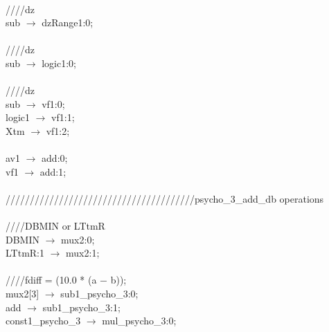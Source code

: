{   \\
   \hspace*{2em}////dz \\
   \hspace*{2em}sub $\rightarrow$ dzRange1:0; \\
   \\
   \hspace*{2em}////dz \\
   \hspace*{2em}sub $\rightarrow$ logic1:0; \\
   \\
   \hspace*{2em}////dz \\
   \hspace*{2em}sub $\rightarrow$ vf1:0; \\
   \hspace*{2em}logic1 $\rightarrow$ vf1:1; \\
   \hspace*{2em}Xtm $\rightarrow$ vf1:2; \\
   \\
   \hspace*{2em}av1 $\rightarrow$ add:0; \\
   \hspace*{2em}vf1 $\rightarrow$ add:1; \\
   \\
   \hspace*{2em}///////////////////////////////////////psycho\_3\_add\_db operations \\
   \\
   \hspace*{2em}////DBMIN or LTtmR \\
   \hspace*{2em}DBMIN $\rightarrow$ mux2:0; \\
   \hspace*{2em}LTtmR:1 $\rightarrow$ mux2:1; \\
   \\
   \hspace*{2em}////fdiff = (10.0 * (a $-$ b)); \\
   \hspace*{2em}mux2[3] $\rightarrow$ sub1\_psycho\_3:0; \\
   \hspace*{2em}add $\rightarrow$ sub1\_psycho\_3:1; \\
   \hspace*{2em}const1\_psycho\_3 $\rightarrow$ mul\_psycho\_3:0; \\
}
